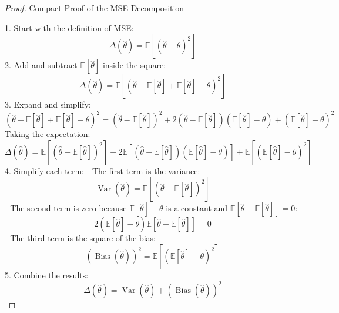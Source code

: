 \begin{proof}
    Compact Proof of the MSE Decomposition 

1. Start with the definition of MSE:
\begin{equation}
    \Delta(\hat{\theta}) = \mathbb{E}\left[(\hat{\theta} - \theta)^2\right]
\end{equation}
2. Add and subtract $\mathbb{E}[\hat{\theta}]$ inside the square:
\begin{equation}
    \Delta(\hat{\theta}) = \mathbb{E}\left[(\hat{\theta} - \mathbb{E}[\hat{\theta}] + \mathbb{E}[\hat{\theta}] - \theta)^2\right]
\end{equation}
3. Expand and simplify:
\begin{equation}
    (\hat{\theta} - \mathbb{E}[\hat{\theta}] + \mathbb{E}[\hat{\theta}] - \theta)^2 = (\hat{\theta} - \mathbb{E}[\hat{\theta}])^2 + 2(\hat{\theta} - \mathbb{E}[\hat{\theta}])(\mathbb{E}[\hat{\theta}] - \theta) + (\mathbb{E}[\hat{\theta}] - \theta)^2
\end{equation}
Taking the expectation:
\begin{equation}
    \Delta(\hat{\theta}) = \mathbb{E}[(\hat{\theta} - \mathbb{E}[\hat{\theta}])^2] + 2\mathbb{E}[(\hat{\theta} - \mathbb{E}[\hat{\theta}])(\mathbb{E}[\hat{\theta}] - \theta)] + \mathbb{E}[(\mathbb{E}[\hat{\theta}] - \theta)^2]
\end{equation}
4. Simplify each term:
   - The first term is the variance:
\begin{equation}
    \operatorname{Var}(\hat{\theta}) = \mathbb{E}[(\hat{\theta} - \mathbb{E}[\hat{\theta}])^2]
\end{equation}
- The second term is zero because $\mathbb{E}[\hat{\theta}] - \theta$ is a constant and $\mathbb{E}[\hat{\theta} - \mathbb{E}[\hat{\theta}]] = 0$:
\begin{equation}
    2(\mathbb{E}[\hat{\theta}] - \theta)\mathbb{E}[\hat{\theta} - \mathbb{E}[\hat{\theta}]] = 0
\end{equation}
- The third term is the square of the bias:
\begin{equation}
    (\operatorname{Bias}(\hat{\theta}))^2 = \mathbb{E}[(\mathbb{E}[\hat{\theta}] - \theta)^2]
\end{equation}
5. Combine the results:
\begin{equation}
    \Delta(\hat{\theta}) = \operatorname{Var}(\hat{\theta}) + (\operatorname{Bias}(\hat{\theta}))^2
\end{equation}
\end{proof}
